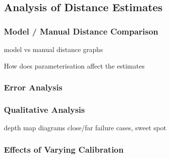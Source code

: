 \subsection{Analysis of Distance Estimates}

\subsubsection{Model / Manual Distance Comparison}

model vs manual distance graphs

How does parameterisation affect the estimates

\subsubsection{Error Analysis}

\subsubsection{Qualitative Analysis}
depth map diagrams
close/far failure cases, sweet spot

\subsubsection{Effects of Varying Calibration}
